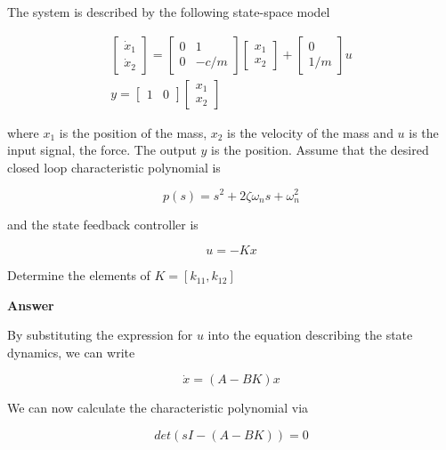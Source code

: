 The system is described by the following state-space model

\begin{eqnarray}
\begin{bmatrix}
 \dot{x}_1 \\
 \dot{x}_2 
\end{bmatrix} =  
\begin{bmatrix}
 0 & 1 \\
 0 & -c/m
\end{bmatrix}
\begin{bmatrix}
 x_1 \\
 x_2  
\end{bmatrix}+
\begin{bmatrix}
 0 \\
 1/m  
\end{bmatrix}u \\
y =
\begin{bmatrix}
 1 & 0 
\end{bmatrix}
\begin{bmatrix}
 x_1 \\
 x_2  
\end{bmatrix}
\end{eqnarray}

where $x_1$ is the position of the mass, $x_2$ is the velocity of the mass and $u$ is the input signal, the force. The output $y$ is the position. Assume that the desired closed loop characteristic polynomial is

\begin{equation}
p(s) = s^2 + 2\zeta \omega_n s +\omega_{n}^{2}  
\end{equation}

and the state feedback controller is 

\begin{equation}
u = -Kx  
\end{equation}

Determine the elements of $K=[k_{11}, k_{12}]$

\textbf{Answer}

By substituting the expression for $u$ into the equation describing the state dynamics, we can write

\begin{equation}
\dot{x} = (A - BK)x
\end{equation}

We can now calculate the characteristic polynomial via


\begin{equation}
det(s I - (A - BK)) = 0
\end{equation}

